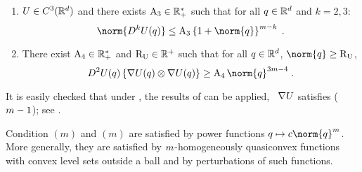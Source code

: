 \begin{assumption}[$\m$]
\label{assum:potential}
\begin{enumerate}[label = (\roman*)]
\item \label{assum:potential:a}
$U \in C^3(\mathbb{R}^d)$  and there exists $\operatorname{A}_3 \in \mathbb{R}_+^*$ such that for all $q \in \mathbb{R}^d$ and $k=2,3$:
\begin{equation}
\norm{D^k \F(\q)}\leq \constone \defEns{1+\norm{\q}}^{\m-k} \eqsp.
\end{equation}
\item \label{assum:potential:b}
There exist $\operatorname{A}_4 \in \mathbb{R}_+^* $ and $\operatorname{R_U} \in \mathbb{R}^+$ such that for all $q \in \mathbb{R}^d$, $\norm{q}\geq \rhtwo$,
\begin{equation}
D^2\F(\q)\defEns{ \nabla \F(\q)\otimes  \nabla \F(\q)}  \geq \consttwo \norm{\q}^{3\m-4} \eqsp.
\end{equation}
  \end{enumerate}
\end{assumption}

It is easily checked that under , the results of  can be applied, \ie~$\nabla U$ satisfies ($m-1$); see .

Condition $(m)$ and $(m)$ are satisfied by power functions $\q \mapsto c\norm{\q}^\m$. More generally, they are satisfied by $\m$-homogeneously quasiconvex functions with convex level sets  outside a ball and by  perturbations of such functions.

